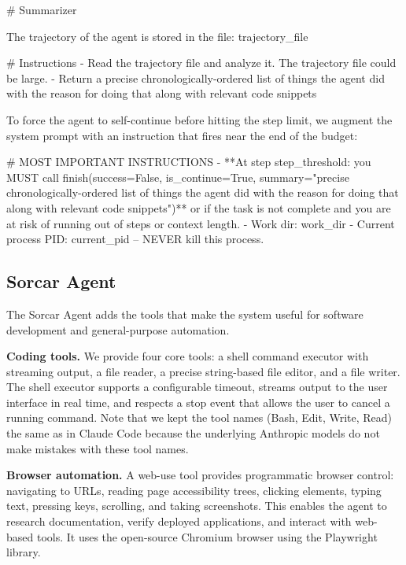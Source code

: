 \documentclass{article}
\begin{document}
\begin{prompt}
# Summarizer

The trajectory of the agent is stored in the file: {trajectory_file}

# Instructions
- Read the trajectory file and analyze it.  The trajectory file
  could be large.
- Return a precise chronologically-ordered list of things the
  agent did with the reason for doing that along with relevant
  code snippets
\end{prompt}

\noindent To force the agent to self-continue before hitting the step limit, we augment the system prompt with an instruction that fires near the end of the budget:

\begin{prompt}
# MOST IMPORTANT INSTRUCTIONS
- **At step {step_threshold}: you MUST call
  finish(success=False, is_continue=True,
  summary="precise chronologically-ordered list of things
  the agent did with the reason for doing that along with
  relevant code snippets")** or if the task is not complete
  and you are at risk of running out of steps or context
  length.
- Work dir: {work_dir}
- Current process PID: {current_pid} -- NEVER kill this
  process.
\end{prompt}

\subsection{Sorcar Agent}
\label{sec:sorcar-agent}

The Sorcar Agent adds the tools that make the system useful for software development and general-purpose automation.

\textbf{Coding tools.}  We provide four core tools: a shell command executor with streaming output, a file reader, a precise string-based file editor, and a file writer.  The shell executor supports a configurable timeout, streams output to the user interface in real time, and respects a stop event that allows the user to cancel a running command.  Note that we kept the tool names (Bash, Edit, Write, Read) the same as in Claude Code because the underlying Anthropic models do not make mistakes with these tool names.

\textbf{Browser automation.}  A web-use tool provides programmatic browser control: navigating to URLs, reading page accessibility trees, clicking elements, typing text, pressing keys, scrolling, and taking screenshots.  This enables the agent to research documentation, verify deployed applications, and interact with web-based tools. It uses the open-source Chromium browser using the Playwright library. 
\end{document}
